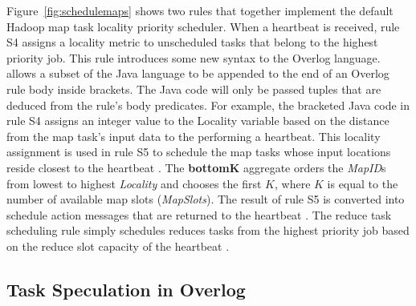 Figure~\ref{fig:schedulemaps} shows two rules that together implement the default Hadoop map task locality priority scheduler.
When a \TT heartbeat is received, rule S4 assigns a locality metric to unscheduled tasks that belong to the highest priority job.
This rule introduces some new syntax to the Overlog language. \JOL allows a subset of the Java language to be appended to the
end of an Overlog rule body inside brackets. The Java code will only be passed tuples that are deduced from the rule's body predicates.
For example, the bracketed Java code in rule S4 assigns an integer value to the Locality variable based on the distance from the map task's input data to the 
\TT performing a heartbeat. This locality assignment is used in rule S5 to schedule the map tasks whose input locations reside closest to 
the heartbeat \TT. The {\bf bottomK} aggregate orders the {\em MapID}s from lowest to highest {\em Locality} and chooses the first $K$, where
$K$ is equal to the number of available map slots ({\em MapSlots}). The result of rule S5 is converted into schedule action messages that are 
returned to the heartbeat \TT. The reduce task scheduling rule simply schedules reduces tasks from the highest priority job based on
the reduce slot capacity of the heartbeat \TT. 

\subsection{Task Speculation in Overlog}

